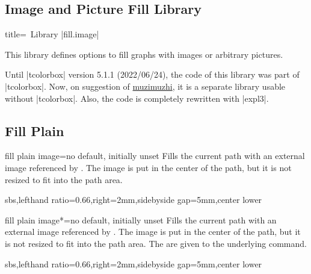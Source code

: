 \documentclass[a4paper,11pt]{article}
\begin{document}
\begin{myvoid}

\clearpage
\section{Image and Picture Fill Library}\label{sec:imagefill}%

\begin{dispListing*}{title=\tikzname\ Library |fill.image|}
\usetikzlibrary{fill.image} %
\usepackage{tikzfill.image} %
\end{dispListing*}

This library defines options to fill graphs with images or arbitrary pictures.

Until |tcolorbox| version 5.1.1 (2022/06/24), the code of this library was part
of |tcolorbox|. Now, on suggestion of
\href{https://github.com/muzimuzhi}{muzimuzhi},
it is a separate library usable without |tcolorbox|. Also, the code is
completely rewritten with |expl3|.



\subsection{Fill Plain}
\begin{docTikzKey}{fill plain image}{=}{no default, initially unset}
  Fills the current path with an external image referenced by .
  The image is put in the center of the path, but it is not resized to fit into
  the path area.
\begin{dispExample*}{sbs,lefthand ratio=0.66,right=2mm,sidebyside gap=5mm,center lower}
\end{dispExample*}
\end{docTikzKey}


\begin{docTikzKey}{fill plain image*}{=}{no default, initially unset}
  Fills the current path with an external image referenced by .
  The image is put in the center of the path, but it is not resized to fit into
  the path area.
  The  are given to the underlying  command.
\begin{dispExample*}{sbs,lefthand ratio=0.66,right=2mm,sidebyside gap=5mm,center lower}
\end{dispExample*}
\end{docTikzKey}


\end{myvoid}
\end{document}
